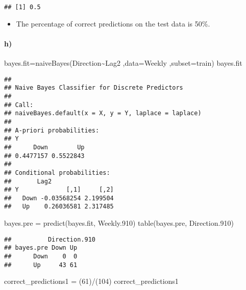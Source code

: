 \documentclass[
]{article}
\newenvironment{Shaded}{\begin{snugshade}}{\end{snugshade}}
\newcommand{\AttributeTok}[1]{\textcolor[rgb]{0.77,0.63,0.00}{#1}}
\newcommand{\DecValTok}[1]{\textcolor[rgb]{0.00,0.00,0.81}{#1}}
\newcommand{\FloatTok}[1]{\textcolor[rgb]{0.00,0.00,0.81}{#1}}
\newcommand{\FunctionTok}[1]{\textcolor[rgb]{0.00,0.00,0.00}{#1}}
\newcommand{\NormalTok}[1]{#1}
\newcommand{\OtherTok}[1]{\textcolor[rgb]{0.56,0.35,0.01}{#1}}
\newcommand{\SpecialCharTok}[1]{\textcolor[rgb]{0.00,0.00,0.00}{#1}}
\providecommand{\tightlist}{%
  \setlength{\itemsep}{0pt}\setlength{\parskip}{0pt}}
\begin{document}
\begin{verbatim}
## [1] 0.5
\end{verbatim}

\begin{itemize}
\tightlist
\item
  The percentage of correct predictions on the test data is 50\%.
\end{itemize}

\hypertarget{h}{%
\paragraph{h)}\label{h}}

\begin{Shaded}
\begin{Highlighting}[]
\NormalTok{bayes.fit}\OtherTok{=}\FunctionTok{naiveBayes}\NormalTok{(Direction}\SpecialCharTok{\textasciitilde{}}\NormalTok{Lag2 ,}\AttributeTok{data=}\NormalTok{Weekly ,}\AttributeTok{subset=}\NormalTok{train)}
\NormalTok{bayes.fit}
\end{Highlighting}
\end{Shaded}

\begin{verbatim}
## 
## Naive Bayes Classifier for Discrete Predictors
## 
## Call:
## naiveBayes.default(x = X, y = Y, laplace = laplace)
## 
## A-priori probabilities:
## Y
##      Down        Up 
## 0.4477157 0.5522843 
## 
## Conditional probabilities:
##       Lag2
## Y             [,1]     [,2]
##   Down -0.03568254 2.199504
##   Up    0.26036581 2.317485
\end{verbatim}

\begin{Shaded}
\begin{Highlighting}[]
\NormalTok{bayes.pre }\OtherTok{=} \FunctionTok{predict}\NormalTok{(bayes.fit, Weekly}\FloatTok{.910}\NormalTok{)}
\FunctionTok{table}\NormalTok{(bayes.pre, Direction}\FloatTok{.910}\NormalTok{)}
\end{Highlighting}
\end{Shaded}

\begin{verbatim}
##          Direction.910
## bayes.pre Down Up
##      Down    0  0
##      Up     43 61
\end{verbatim}

\begin{Shaded}
\begin{Highlighting}[]
\NormalTok{correct\_predictions1 }\OtherTok{=}\NormalTok{ (}\DecValTok{61}\NormalTok{)}\SpecialCharTok{/}\NormalTok{(}\DecValTok{104}\NormalTok{)}
\NormalTok{correct\_predictions1}
\end{Highlighting}
\end{Shaded}
\end{document}

